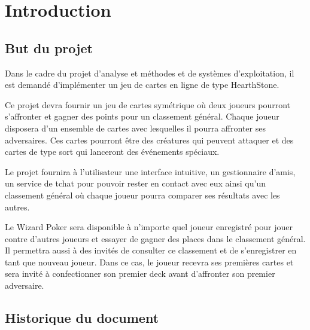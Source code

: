 \documentclass[11pt,a4paper]{article}
\begin{document}

\pagestyle{empty}
\tableofcontents
\newpage
\pagestyle{fancy}

\setcounter{page}{1}

\section{Introduction}
\label{sec:intro}

\subsection{But du projet}
\label{sec:but}

Dans le cadre du projet d'analyse et méthodes et de systèmes
d'exploitation, il est demandé d'implémenter un jeu de cartes en ligne
de type HearthStone.

\medbreak

Ce projet devra fournir un jeu de cartes symétrique où deux joueurs
pourront s'affronter et gagner des points pour un classement
général. Chaque joueur disposera d'un ensemble de cartes avec lesquelles
il pourra affronter ses adversaires. Ces cartes pourront être des
créatures qui peuvent attaquer et des cartes de type
sort qui lanceront des événements spéciaux.

\medbreak

Le projet fournira à l'utilisateur une interface intuitive, un gestionnaire
d'amis, un service de tchat pour pouvoir rester en contact avec eux ainsi
qu'un classement général où chaque joueur pourra comparer ses résultats avec
les autres.

\medbreak

Le Wizard Poker sera disponible à n'importe quel joueur enregistré
pour jouer contre d'autres joueurs et essayer de gagner des places
dans le classement général. Il permettra aussi à des invités
de consulter ce classement et de s'enregistrer en tant que nouveau
joueur. Dans ce cas, le joueur recevra ses premières cartes et sera
invité à confectionner son premier deck avant d'affronter son premier
adversaire.

\subsection{Historique du document}
\label{sec:hist}
\end{document}
